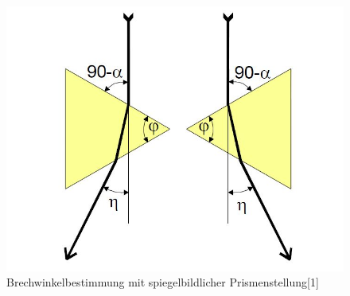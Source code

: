 	\begin{figure}[h]
		\begin{center}
		\includegraphics[scale=0.3]{picbrechwinkel.jpg}
		\caption{Brechwinkelbestimmung mit spiegelbildlicher Prismenstellung[1]}
		\label{picbrechwinkel}
		\end{center}	
	\end{figure}